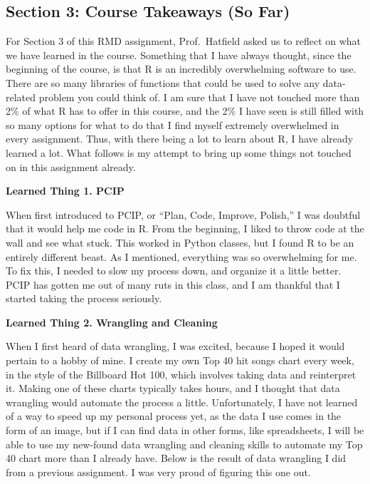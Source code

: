 \documentclass[
]{article}
\begin{document}
\hypertarget{section-3-course-takeaways-so-far}{%
\subsection{Section 3: Course Takeaways (So
Far)}\label{section-3-course-takeaways-so-far}}

For Section 3 of this RMD assignment, Prof.~Hatfield asked us to reflect
on what we have learned in the course. Something that I have always
thought, since the beginning of the course, is that R is an incredibly
overwhelming software to use. There are so many libraries of functions
that could be used to solve any data-related problem you could think of.
I am sure that I have not touched more than 2\% of what R has to offer
in this course, and the 2\% I have seen is still filled with so many
options for what to do that I find myself extremely overwhelmed in every
assignment. Thus, with there being a lot to learn about R, I have
already learned a lot. What follows is my attempt to bring up some
things not touched on in this assignment already.

\textbf{Learned Thing 1. PCIP}

When first introduced to PCIP, or ``Plan, Code, Improve, Polish,'' I was
doubtful that it would help me code in R. From the beginning, I liked to
throw code at the wall and see what stuck. This worked in Python
classes, but I found R to be an entirely different beast. As I
mentioned, everything was so overwhelming for me. To fix this, I needed
to slow my process down, and organize it a little better. PCIP has
gotten me out of many ruts in this class, and I am thankful that I
started taking the process seriously.

\textbf{Learned Thing 2. Wrangling and Cleaning}

When I first heard of data wrangling, I was excited, because I hoped it
would pertain to a hobby of mine. I create my own Top 40 hit songs chart
every week, in the style of the Billboard Hot 100, which involves taking
data and reinterpret it. Making one of these charts typically takes
hours, and I thought that data wrangling would automate the process a
little. Unfortunately, I have not learned of a way to speed up my
personal process yet, as the data I use comes in the form of an image,
but if I can find data in other forms, like spreadsheets, I will be able
to use my new-found data wrangling and cleaning skills to automate my
Top 40 chart more than I already have. Below is the result of data
wrangling I did from a previous assignment. I was very proud of figuring
this one out.
\end{document}
